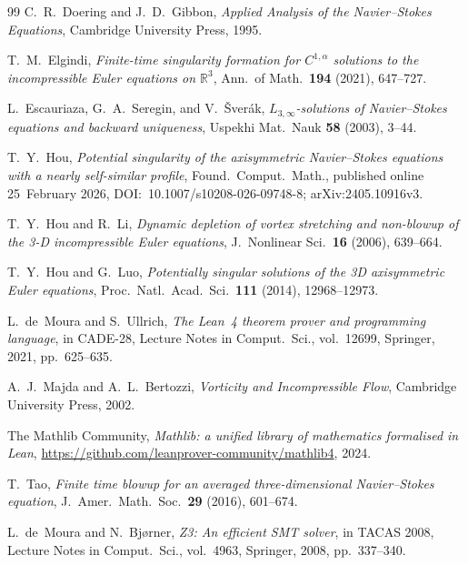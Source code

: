 \documentclass[11pt,a4paper]{article}
\theoremstyle{definition}
\begin{document}
\begin{thebibliography}{99}
C.~R.~Doering and J.~D.~Gibbon,
\emph{Applied Analysis of the Navier--Stokes Equations},
Cambridge University Press, 1995.

T.~M.~Elgindi,
\emph{Finite-time singularity formation for $C^{1,\alpha}$ solutions to the incompressible Euler equations on $\mathbb{R}^3$},
Ann.\ of Math.\ \textbf{194} (2021), 647--727.

L.~Escauriaza, G.~A.~Seregin, and V.~\v{S}ver\'ak,
\emph{$L_{3,\infty}$-solutions of Navier--Stokes equations and backward uniqueness},
Uspekhi Mat.\ Nauk \textbf{58} (2003), 3--44.

T.~Y.~Hou,
\emph{Potential singularity of the axisymmetric Navier--Stokes equations with a nearly self-similar profile},
Found.\ Comput.\ Math., published online 25~February 2026,
DOI:~10.1007/s10208-026-09748-8; arXiv:2405.10916v3.

T.~Y.~Hou and R.~Li,
\emph{Dynamic depletion of vortex stretching and non-blowup of the 3-D incompressible Euler equations},
J.~Nonlinear Sci.\ \textbf{16} (2006), 639--664.

T.~Y.~Hou and G.~Luo,
\emph{Potentially singular solutions of the 3D axisymmetric Euler equations},
Proc.\ Natl.\ Acad.\ Sci.\ \textbf{111} (2014), 12968--12973.

L.~de~Moura and S.~Ullrich,
\emph{The Lean~4 theorem prover and programming language},
in CADE-28, Lecture Notes in Comput.\ Sci., vol.~12699, Springer, 2021, pp.~625--635.

A.~J.~Majda and A.~L.~Bertozzi,
\emph{Vorticity and Incompressible Flow},
Cambridge University Press, 2002.

The Mathlib Community,
\emph{Mathlib: a unified library of mathematics formalised in Lean},
\url{https://github.com/leanprover-community/mathlib4}, 2024.

T.~Tao,
\emph{Finite time blowup for an averaged three-dimensional Navier--Stokes equation},
J.~Amer.\ Math.\ Soc.\ \textbf{29} (2016), 601--674.

L.~de~Moura and N.~Bj{\o}rner,
\emph{Z3: An efficient SMT solver},
in TACAS 2008, Lecture Notes in Comput.\ Sci., vol.~4963, Springer, 2008, pp.~337--340.

\end{thebibliography}
\end{document}
